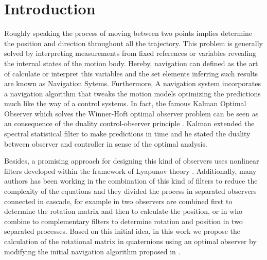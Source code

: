\documentclass[conference]{IEEEtran}
\begin{document}
\section{Introduction}
Roughly speaking the process of moving between two points implies determine the position and direction throughout all the trajectory. This problem is generally solved by interpreting measurements from fixed references or variables revealing the internal states of the motion body. Hereby, navigation can defined as the art of calculate or interpret this variables and the set elements inferring such results are  known as Navigation Sytems. 
Furthermore, A navigation system incorporates a navigation algorithm that tweaks the motion models optimizing the predictions much like the way of a control systems.  In fact, the famous Kalman Optimal Observer which solves the Winner-Hoft optimal observer problem can be seen as an consequence of the duality control-observer principle \cite{Kalman1960}. Kalman extended the spectral statistical filter to make predictions in time and he stated the duality between observer and controller in sense of the optimal analysis.\par 
Besides, a promising approach for designing this kind of observers uses nonlinear filters developed within the framework of Lyapunov theory \cite{Lukyanov1996,Nicosia1996,Algrain1997}. Additionally, many authors has been working in the combination of this kind of filters  to reduce the complexity of the equations and they divided the process in separated observers connected in cascade, for example in \cite{Vasconcelos2008} two observers are combined first to determine the rotation matrix and then to calculate the position, or in \cite{Scandaro2011} who combine to complementary filters to determine rotation and position in two separated processes.  Based on this initial idea, in this work we propose the calculation of the rotational matrix in quaternions using an optimal observer by modifying the initial navigation algorithm proposed in \cite{Scandaro2011}.\par
%
\end{document}
